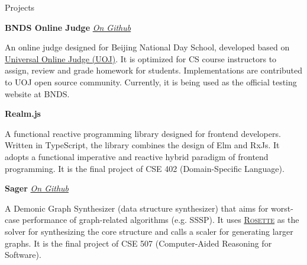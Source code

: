 \documentclass{resume}
\begin{document}
	\begin{rSection}{Projects}
	
		\textbf{BNDS Online Judge} \hfill {\em {\href{https://github.com/AD1024/BNDSOJ}{On Github}}}
		\vspace{-5pt}

		An online judge designed for Beijing National Day School, developed based on \href{https://github.com/vfleaking/uoj}{Universal Online Judge (UOJ)}. It is optimized for CS course instructors to assign, review and grade homework for students. Implementations are contributed to UOJ open source community. Currently, it is being used as the official testing website at BNDS.
		\vspace{-5pt}

		\textbf{Realm.js}
		\vspace{-5pt}

		A functional reactive programming library designed for frontend developers. Written in TypeScript, the library combines the design of Elm and RxJs. It adopts a functional imperative and reactive hybrid paradigm of frontend programming. It is the final project of CSE 402 (Domain-Specific Language).
		\vspace{-5pt}

		\textbf{Sager} \hfill {\em {\href{https://github.com/AD1024/Sager}{On Github}}}
		\vspace{-5pt}

		A Demonic Graph Synthesizer (data structure synthesizer) that aims for worst-case performance of graph-related algorithms (e.g. SSSP). It uses \href{https://github.com/emina/rosette}{\textsc{Rosette}} as the solver for synthesizing the core structure and calls a scaler for generating larger graphs. It is the final project of CSE 507 (Computer-Aided Reasoning for Software).




\end{rSection}
\end{document}
